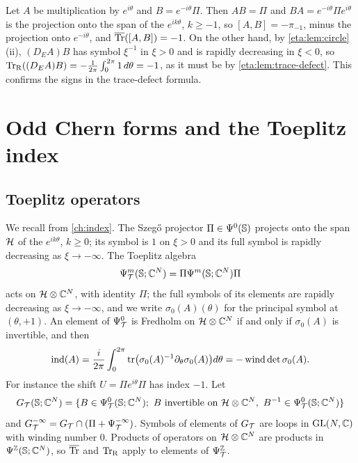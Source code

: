 \begin{example}\label{eta:ex:defect-check}
Let $A$ be multiplication by $e^{i\theta}$ and $B=e^{-i\theta}\Pi$. Then $AB=\Pi$ and
$BA=e^{-i\theta}\Pi e^{i\theta}$ is the projection onto the span of the $e^{ik\theta}$,
$k\ge-1$, so $[A,B]=-\pi_{-1}$, minus the projection onto $e^{-i\theta}$, and $\overline{\operatorname{Tr}}([A,B])=-1$. On the other hand, by \cref{eta:lem:circle}(ii),
$(D_EA)B$ has symbol $\xi^{-1}$ in $\xi>0$ and is rapidly decreasing in $\xi<0$, so
$\operatorname{Tr}_{\mathrm{R}}((D_EA)B)=-\frac1{2\pi}\int_0^{2\pi}1\,d\theta=-1$, as it must be by
\cref{eta:lem:trace-defect}. This confirms the signs in the trace-defect formula.
\end{example}

\section{Odd Chern forms and the Toeplitz index}\label{eta:sec:chern}

\subsection{Toeplitz operators} We recall from \cref{ch:index}. The Szeg\H{o} projector
$\Pi\in\Psi^{0}(\mathbb{S})$ projects onto the span $\mathcal{H}$ of the $e^{ik\theta}$,
$k\ge0$; its symbol is $1$ on $\xi>0$ and its full symbol is rapidly decreasing as
$\xi\to-\infty$. The Toeplitz algebra
\[
\Psi^{m}_{\mathcal{T}}(\mathbb{S};\mathbb{C}^N)=\Pi\Psi^{m}(\mathbb{S};\mathbb{C}^N)\Pi
\]
acts on $\mathcal{H}\otimes\mathbb{C}^N$, with identity $\Pi$; the full symbols of its elements are
rapidly decreasing as $\xi\to-\infty$, and we write $\sigma_0(A)(\theta)$ for the
principal symbol at $(\theta,+1)$. An element of $\Psi^{0}_{\mathcal{T}}$ is Fredholm on
$\mathcal{H}\otimes\mathbb{C}^N$ if and only if $\sigma_0(A)$ is invertible, and then
\begin{equation}\label{eta:eq:toeplitz-index}
\operatorname{ind}(A)=\frac{i}{2\pi}\int_0^{2\pi}\operatorname{tr}\bigl(\sigma_0(A)^{-1}\partial_\theta\sigma_0(A)\bigr)d\theta
=-\operatorname{wind}\det\sigma_0(A).
\end{equation}
For instance the shift $U=\Pi e^{i\theta}\Pi$ has index $-1$. Let
\[
\GTeta(\Sphere;\C^N)=\{B\in\PsiT{0}(\Sphere;\C^N);\ B\text{ invertible on }\HardyL\otimes\C^N,
\ B^{-1}\in\PsiT{0}(\Sphere;\C^N)\}
\]
and $G^{-\infty}_{\mathcal T}=G_{\mathcal{T}}\cap(\Pi+\Psi^{-\infty}_{\mathcal{T}})$. Symbols of elements of
$G_{\mathcal{T}}$ are loops in $\operatorname{GL}(N,\mathbb{C})$ with winding number $0$. Products of operators on
$\mathcal{H}\otimes\mathbb{C}^N$ are products in $\Psi^{\mathbb{Z}}(\mathbb{S};\mathbb{C}^N)$, so $\overline{\operatorname{Tr}}$ and $\operatorname{Tr}_{\mathrm{R}}$
apply to elements of $\Psi^{\mathbb{Z}}_{\mathcal{T}}$.


